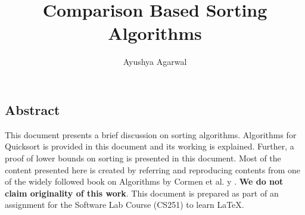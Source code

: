 \documentclass[10pt]{article}
\title{Comparison Based Sorting Algorithms}
\author{Ayushya Agarwal }
\date{\vspace{-3ex}}
\begin{document}
\maketitle
\begin{multicols*}{2}
\section*{Abstract}
This document presents a brief discussion on sorting
algorithms. Algorithms for Quicksort is provided
in this document and its working is explained.
Further, a proof of lower bounds on sorting is presented
in this document. Most of the content presented
here is created by referring and reproducing
contents from one of the widely followed book on
Algorithms by Cormen et al. \cite{cormen2009introduction}y . \textbf{We do not claim
originality of this work}. This document is prepared
as part of an assignment for the Software Lab
Course (CS251) to learn \LaTeX.
\newline
{}

\end{multicols*}
\end{document}

